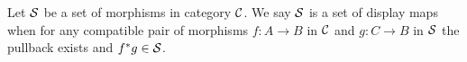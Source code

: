 \begin{dfn}
  Let $\mathcal{S}$ be a set of morphisms in category $\mathcal{C}$.
  We say $\mathcal{S}$ is a set of display maps when for any compatible
  pair of morphisms $f : A \to B$ in $\mathcal{C}$ and $g : C \to B$ in $\mathcal{S}$
  the pullback exists and $f^{*}g \in \mathcal{S}$.
\end{dfn}




